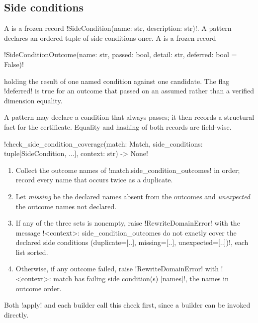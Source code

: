 \subsection{Side conditions}

\begin{definition}\label{def:rewriting-sidecond}
A  is a frozen record \py!SideCondition(name: str, description: str)!. A
pattern declares an ordered tuple of side conditions once. A  is a
frozen record
\begin{signature}
\py!SideConditionOutcome(name: str, passed: bool, detail: str, deferred: bool = False)!
\end{signature}
holding the result of one named condition against one candidate. The flag \py!deferred! is true
for an outcome that passed on an assumed rather than a verified dimension equality.
\end{definition}

A pattern may declare a condition that always passes; it then records a structural fact for the
certificate. Equality and hashing of both records are field-wise.

\begin{signature}
\py!check_side_condition_coverage(match: Match, side_conditions: tuple[SideCondition, ...], context: str) -> None!
\end{signature}
\begin{algorithm}\label{alg:rewriting-coverage}
\leavevmode
\begin{enumerate}
\item Collect the outcome names of \py!match.side_condition_outcomes! in order; record every name
  that occurs twice as a duplicate.
\item Let \emph{missing} be the declared names absent from the outcomes and \emph{unexpected} the
  outcome names not declared.
\item If any of the three sets is nonempty, raise \py!RewriteDomainError! with the message
  \code!<context>: side_condition_outcomes do not exactly cover the declared side conditions (duplicate=[..], missing=[..], unexpected=[..])!, each list sorted.
\item Otherwise, if any outcome failed, raise \py!RewriteDomainError! with
  \code!<context>: match has failing side condition(s) [names]!, the names in outcome order.
\end{enumerate}
\end{algorithm}
Both \py!apply! and each builder call this check first, since a builder can be invoked directly.

